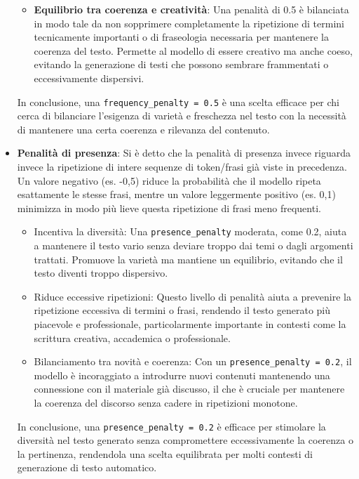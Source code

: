 \begin{itemize}
\begin{itemize}
                \item \textbf{Equilibrio tra coerenza e creatività}: Una penalità di 0.5 è bilanciata in modo tale da non sopprimere completamente la ripetizione di termini tecnicamente importanti o di fraseologia necessaria per mantenere la coerenza del testo. Permette al modello di essere creativo ma anche coeso, evitando la generazione di testi che possono sembrare frammentati o eccessivamente dispersivi. 
            \end{itemize}
        
            In conclusione, una \texttt{frequency\_penalty = 0.5} è una scelta efficace per chi cerca di bilanciare l'esigenza di varietà e freschezza nel testo con la necessità di mantenere una certa coerenza e rilevanza del contenuto. 

        \item
            \textbf{Penalità di presenza}: Si è detto che la penalità di presenza invece riguarda invece la ripetizione di intere sequenze di token/frasi già viste in precedenza. Un valore negativo (es. -0,5) riduce la probabilità che il modello ripeta esattamente le stesse frasi, mentre un valore leggermente positivo (es. 0,1) minimizza in modo più lieve questa ripetizione di frasi meno frequenti. 
            \begin{itemize}
                \item Incentiva la diversità: Una \texttt{presence\_penalty} moderata, come 0.2, aiuta a mantenere il testo vario senza deviare troppo dai temi o dagli argomenti trattati. Promuove la varietà ma mantiene un equilibrio, evitando che il testo diventi troppo dispersivo.   
                    
                \item Riduce eccessive ripetizioni: Questo livello di penalità aiuta a prevenire la ripetizione eccessiva di termini o frasi, rendendo il testo generato più piacevole e professionale, particolarmente importante in contesti come la scrittura creativa, accademica o professionale.   
                    
                \item Bilanciamento tra novità e coerenza: Con un \texttt{presence\_penalty = 0.2}, il modello è incoraggiato a introdurre nuovi contenuti mantenendo una connessione con il materiale già discusso, il che è cruciale per mantenere la coerenza del discorso senza cadere in ripetizioni monotone. 
            \end{itemize}
        
            In conclusione, una \texttt{presence\_penalty = 0.2} è efficace per stimolare la diversità nel testo generato senza compromettere eccessivamente la coerenza o la pertinenza, rendendola una scelta equilibrata per molti contesti di generazione di testo automatico. 
        \end{itemize}
        
